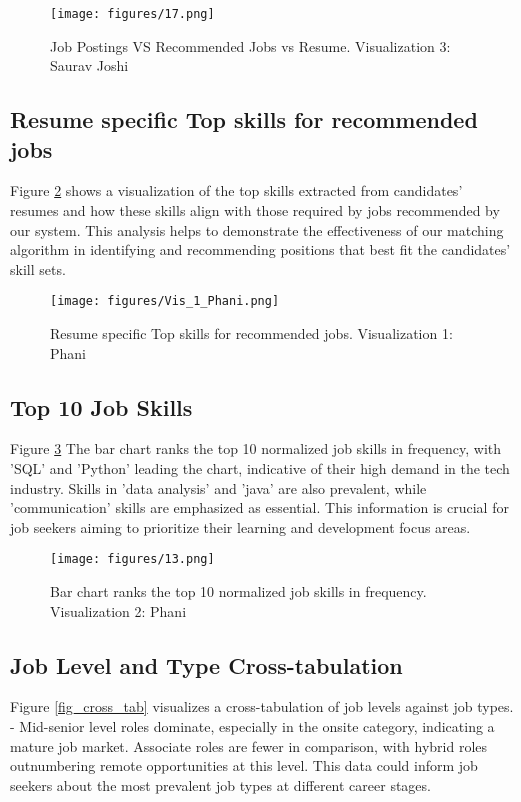 \documentclass[a4paper,10pt]{article}
\begin{document}
    \begin{figure}[ht]
    \centering
    \texttt{[image: figures/17.png]}
    \caption{Job Postings VS Recommended Jobs vs Resume. Visualization 3: Saurav Joshi}
    \label{fig_tsne}
    \end{figure}
    

\subsection{Resume specific Top skills for recommended jobs}

Figure \ref{fig_phani_1} shows a visualization of the top skills extracted from candidates' resumes and how these skills align with those required by jobs recommended by our system. This analysis helps to demonstrate the effectiveness of our matching algorithm in identifying and recommending positions that best fit the candidates' skill sets.

    \begin{figure}[ht]
    \centering
    \texttt{[image: figures/Vis\_1\_Phani.png]}
    \caption{Resume specific Top skills for recommended jobs. Visualization 1: Phani}
    \label{fig_phani_1}
    \end{figure}

\subsection{Top 10 Job Skills}
Figure \ref{fig_top_10} The bar chart ranks the top 10 normalized job skills in frequency, with 'SQL' and 'Python' leading the chart, indicative of their high demand in the tech industry. Skills in 'data analysis' and 'java' are also prevalent, while 'communication' skills are emphasized as essential. This information is crucial for job seekers aiming to prioritize their learning and development focus areas.

    \begin{figure}[ht]
    \centering
    \texttt{[image: figures/13.png]}
    \caption{Bar chart ranks the top 10 normalized job skills in frequency. Visualization 2: Phani}
    \label{fig_top_10}
    \end{figure}

\subsection{Job Level and Type Cross-tabulation}
Figure \ref{fig_cross_tab} visualizes a cross-tabulation of job levels against job types. - Mid-senior level roles dominate, especially in the onsite category, indicating a mature job market.
Associate roles are fewer in comparison, with hybrid roles outnumbering remote opportunities at this level. This data could inform job seekers about the most prevalent job types at different career stages.
\end{document}
